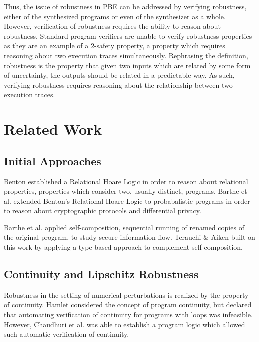 \documentclass{llncs}
\begin{document}
Thus, the issue of robustness in PBE can be addressed by verifying robustness,
either of the synthesized programs or even of the synthesizer as a whole.
However, verification of robustness requires the ability to reason about
robustness.  Standard program verifiers are unable to verify robustness
properties as they are an example of a \(2\)-safety property, a property which
requires reasoning about two execution traces simultaneously.  Rephrasing the definition,
robustness is the property that given two inputs which are related by some form
of uncertainty, the outputs should be related in a predictable way.  As such,
verifying robustness requires reasoning about the relationship between two
execution traces.

\section{Related Work}

  \subsection{Initial Approaches}
    \space\space Benton \cite{benton} established a
    Relational Hoare Logic in order to reason about relational properties,
    properties which consider two, usually distinct, programs.  Barthe et al.
    \cite{barthecrypto,bartheprivacy} extended Benton's Relational Hoare Logic to
    probabalistic programs in order to reason about cryptographic protocols and
    differential privacy.
    \smallskip

    \space\space Barthe et al.
    \cite{barthecomposition} applied self-composition, sequential running of renamed
    copies of the original program, to study secure information flow.  Terauchi \&
    Aiken \cite{terauchi05} built on this work by applying a type-based approach to
    complement self-composition.

  \subsection{Continuity and Lipschitz Robustness}
    \space\space Robustness in the setting of numerical perturbations
    is realized by the property of continuity.  Hamlet \cite{hamlet02} considered the
    concept of program continuity, but declared that automating verification of
    continuity for programs with loops was infeasible.  However, Chaudhuri et al.
    \cite{chaudhuri10} was able to establish a program logic which allowed such
    automatic verification of continuity.
    \smallskip
\end{document}
